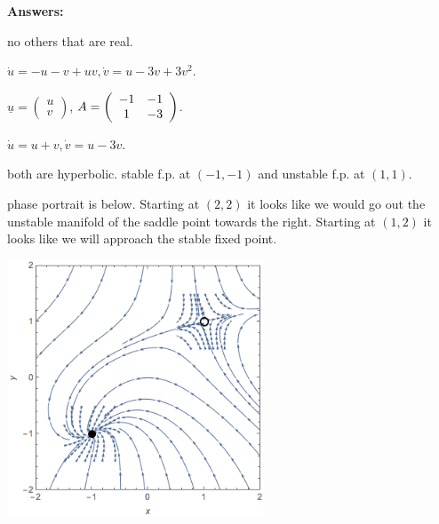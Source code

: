 \documentclass[12pt,letterpaper,noanswers]{exam}
\begin{document}
\eject 
\textbf{Answers:}
\begin{questions}
    
    

\question 
\begin{parts}
\item no others that are real.  
\item $\dot{u} = -u-v+uv, \dot{v} = u-3v+3v^2$.  
\item $\underline{u} = \left(\begin{array}{c} u \\ v \end{array}\right)$, $A = \left(\begin{array}{c c }-1 & -1 \\ 1 & -3 \end{array}\right)$.  
\item $\dot{u} = u+v, \dot{v} = u - 3v$. \item  both are hyperbolic.  stable f.p. at $(-1,-1)$ and unstable f.p. at $(1,1)$.  \item phase portrait is below.  Starting at $(2,2)$ it looks like we would go out the unstable manifold of the saddle point towards the right.  Starting at $(1,2)$ it looks like we will approach the stable fixed point.

\end{parts}

\includegraphics[width=3in]{img/Act19-02-20C08p1.png}

\end{questions}
\end{document}
